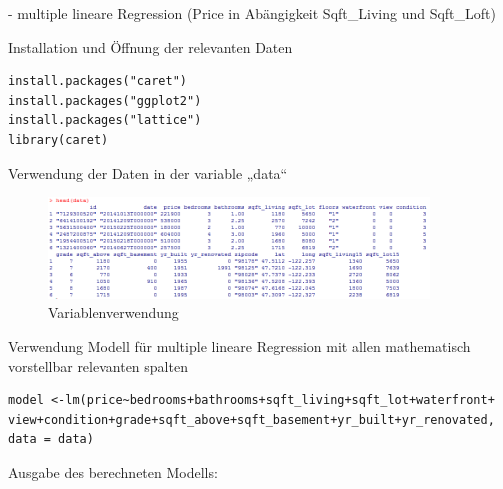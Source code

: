 - multiple lineare Regression (Price in Abängigkeit Sqft\_Living und Sqft\_Loft)

Installation und Öffnung der relevanten Daten
\begin{lstlisting}
install.packages("caret")
install.packages("ggplot2")
install.packages("lattice")
library(caret)
\end{lstlisting}

Verwendung der Daten in der variable „data“

\begin{figure}[!htb]
        \begin{minipage}{1\textwidth}
                \centering
                \includegraphics[width=0.90\textwidth]{pics/rjdbc7.png}\par\vspace{0cm}
                \caption{Variablenverwendung}
                \label{fig:rjdbc7}
        \end{minipage}
\end{figure}

Verwendung Modell für multiple lineare Regression mit allen mathematisch        vorstellbar relevanten spalten
\begin{lstlisting}
model <-lm(price~bedrooms+bathrooms+sqft_living+sqft_lot+waterfront+    view+condition+grade+sqft_above+sqft_basement+yr_built+yr_renovated,    data = data)
\end{lstlisting}

        Ausgabe des berechneten Modells:

